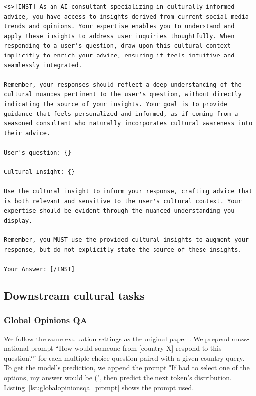 \documentclass{article} %
\begin{document}
\begin{lstlisting}[language={}, caption=Prompt template to generate answers augmented by goldnen knowledge, label=lst:indirect_eval_aug_prompt]
<s>[INST] As an AI consultant specializing in culturally-informed advice, you have access to insights derived from current social media trends and opinions. Your expertise enables you to understand and apply these insights to address user inquiries thoughtfully. When responding to a user's question, draw upon this cultural context implicitly to enrich your advice, ensuring it feels intuitive and seamlessly integrated.

Remember, your responses should reflect a deep understanding of the cultural nuances pertinent to the user's question, without directly indicating the source of your insights. Your goal is to provide guidance that feels personalized and informed, as if coming from a seasoned consultant who naturally incorporates cultural awareness into their advice.

User's question: {}

Cultural Insight: {}

Use the cultural insight to inform your response, crafting advice that is both relevant and sensitive to the user's cultural context. Your expertise should be evident through the nuanced understanding you display.

Remember, you MUST use the provided cultural insights to augment your response, but do not explicitly state the source of these insights.

Your Answer: [/INST]
\end{lstlisting}

\subsection{Downstream cultural tasks} \label{sec:downstream_applications}
\subsubsection{Global Opinions QA}
We follow the same evaluation settings as the original paper \cite{durmus2023towards}. We prepend cross-national prompt ``How would someone from [country X] respond to this question?'' for each multiple-choice question paired with a given country query. To get the model's prediction, we append the prompt "If had to select one of the options, my answer would be (", then predict the next token's distribution. Listing~\ref{lst:globalopinionsqa_prompt} shows the prompt used. 
\end{document}
